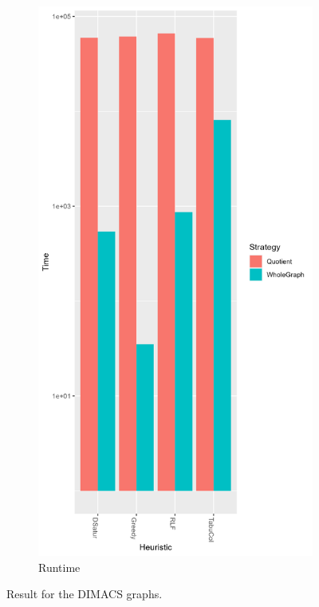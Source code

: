 \documentclass[a4paper]{article}
\begin{document}
\begin{figure}[p]
\begin{subfigure}{\resultbase}
    \end{subfigure}%
    \begin{subfigure}{\resultbase}
        \includegraphics[width=\columnwidth]{Tables/DIMACSTime.png}
      \caption{Runtime}
      \label{fig:dimacst}
    \end{subfigure}
\caption{Result for the DIMACS graphs. \figdesc}
\label{fig:dimacs}
\end{figure}
\end{document}
